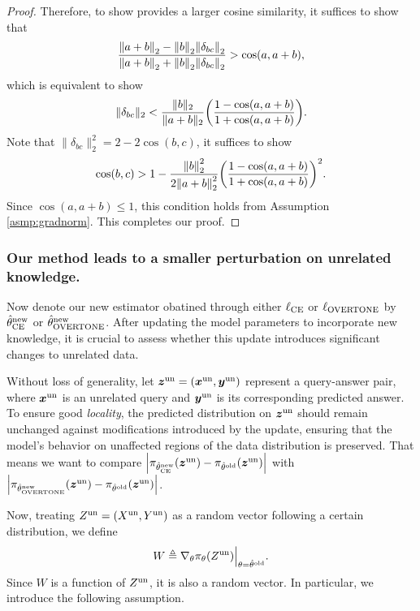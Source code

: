 \begin{proof}
Therefore, to show {\NAME} provides a larger cosine similarity, 
it suffices to show that 
\begin{equation*}
    \frac{\norm{a + b}_2 - \norm{b}_2 \norm{\delta_{bc}}_2}
{\norm{a + b}_2 + \norm{b}_2 \norm{\delta_{bc}}_2} > \cos(a, a + b),
\end{equation*}
which is equivalent to show
\begin{equation*}
    \|\delta_{bc}\|_2 < \frac{\|b\|_2 }{\|a + b\|_2 } \qty(\frac{1 - \cos(a, a + b)}{1 + \cos(a, a + b)}). 
\end{equation*}
Note that $\|\delta_{bc}\|_2^2 = 2 - 2\cos(b, c)$, it suffices to show
\begin{equation*}
    \cos(b, c) > 1 - \frac{\norm{b}_2^2}{2 \norm{a + b}_2^2} 
    \qty( \frac{1 - \cos(a, a + b)}{1 + \cos(a, a + b)} )^2.
\end{equation*}
Since $\cos(a, a + b) \leq 1$, this condition holds from Assumption \ref{asmp:gradnorm}. 
This completes our proof. 
\end{proof}



\subsubsection{Our method leads to a smaller perturbation on unrelated knowledge.}
\label{sec: unrelated data}

Now denote our new estimator obatined through either $\ell_{\text{CE}}$ or $\ell_{\text{OVERTONE}}$ by $\hat{\theta}^{\text{new}}_{\text{CE}}$ or $\hat{\theta}^{\text{new}}_{\text{OVERTONE}}$. After updating the model parameters to incorporate new knowledge, it is crucial to assess whether this update introduces significant changes to unrelated data.

Without loss of generality, let $ \boldsymbol{z}^{\text{un}} = (\boldsymbol{x}^{\text{un}}, \boldsymbol{y}^{\text{un}}) $ represent a query-answer pair, where $ \boldsymbol{x}^{\text{un}} $ is an unrelated query and $ \boldsymbol{y}^{\text{un}} $ is its corresponding predicted answer. To ensure good \textit{locality}, the predicted distribution on $ \boldsymbol{z}^{\text{un}} $ should remain unchanged against modifications introduced by the update, ensuring that the model’s behavior on unaffected regions of the data distribution is preserved. That means we want to compare $\qty| \pi_{\hat{\theta}^{\text{new}}_{\text{CE}}} (\boldsymbol{z}^{\text{un}}) 
- \pi_{\hat{\theta}^{\text{old}}} (\boldsymbol{z}^{\text{un}}) |$ with $\qty| \pi_{\hat{\theta}^{\text{new}}_{\text{OVERTONE}}} (\boldsymbol{z}^{\text{un}}) 
- \pi_{\hat{\theta}^{\text{old}}} (\boldsymbol{z}^{\text{un}}) |$.

Now, treating $ Z^{\text{un}} = (X^{\text{un}}, Y^{\text{un}}) $ as a random vector following a certain distribution, we define
\begin{equation*}
W \triangleq \nabla_\theta \pi_\theta (Z^{\text{un}}) \Big|_{\theta = \hat{\theta}^{\text{old}}}.
\end{equation*}
Since $ W $ is a function of $ Z^{\text{un}} $, it is also a random vector. In particular, we introduce the following assumption.

